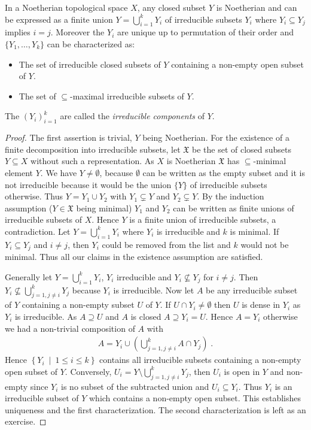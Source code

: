 \documentclass[DIV=14,parskip=full,pointednumbers]{scrartcl}
\theoremstyle{cthm}
\theoremstyle{cvarthm}
\theoremstyle{cdef}
\newcommand{\XX}{\mathfrak{X}}
\newcommand{\st}{\ \middle|\ }
\begin{document}
\begin{prop}[a.k.a. Proposition 2]
 In a Noetherian topological space $X$, any closed subset $Y$ is Noetherian and can be expressed as a finite union $Y= \bigcup_{i=1}^k Y_i$ of irreducible subsets $Y_i$ where $Y_i\subseteq Y_j$ implies $i=j$. Moreover the $Y_i$ are unique up to permutation of their order and $\{Y_1,\ldots, Y_k\}$ can be characterized as:
 \begin{itemize}
  \item The set of irreducible closed subsets of $Y$ containing a non-empty open subset of $Y$.
  \item The set of $\subseteq$-maximal irreducible subsets of $Y$.
 \end{itemize}
The $(Y_i)_{i=1}^k$ are called the \emph{irreducible components} of $Y$.
\end{prop}
\begin{proof}
 The first assertion is trivial, $Y$ being Noetherian. For the existence of a finite decomposition into irreducible subsets, let $\XX$ be the set of closed subsets $Y\subseteq X$ without such a representation. As $X$ is Noetherian $\XX$ has $\subseteq $-minimal element $Y$. We have $Y\neq \emptyset$, because $\emptyset$ can be written as the empty subset and it is not irreducible because it would be the union $\{Y\}$ of irreducible subsets otherwise. Thus $Y= Y_1\cup Y_2$ with $Y_1\subsetneq Y$ and $Y_2\subsetneq Y$. By the induction assumption ($Y\in \XX$ being minimal) $Y_1$ and $Y_2$ can be written as finite unions of irreducible subsets of $X$. Hence $Y$ is a finite union of irreducible subsets, a contradiction. Let $Y=\bigcup_{i=1}^k Y_i$ where $Y_i$ is irreducible and $k$ is minimal. If $Y_i\subseteq Y_j$ and $i\neq j$, then $Y_i$ could be removed from the list and $k$ would not be minimal. Thus all our claims in the existence assumption are satisfied.
 
 Generally let $Y=\bigcup_{i=1}^kY_i$, $Y_i$ irreducible and $Y_i\not\subseteq Y_j$ for $i\neq j$. Then $Y_i\not\subseteq \bigcup_{j=1, j\neq i}^k Y_j$ because $Y_i$ is irreducible. Now let $A$ be any irreducible subset of $Y$ containing a non-empty subset $U$ of $Y$. If $U\cap Y_i\neq \emptyset$ then $U$ is dense in $Y_i$ as $Y_i$ is irreducible. As $A\supseteq U$ and $A$ is closed $A\supseteq Y_i = U$. Hence $A=Y_i$ otherwise we had a non-trivial composition of $A$ with 
 \begin{align*}
  A= Y_i \cup \left(\bigcup_{j=1, j\neq i}^k A\cap Y_j\right)\;.
 \end{align*}
Hence $\left\{ Y_i\st 1\leq i \leq k\right\}$ contains all irreducible subsets containing a non-empty open subset of $Y$. Conversely, $U_i = Y\setminus \bigcup_{j=1, j\neq i}^k Y_j$, then $U_i$ is open in $Y$ and non-empty since $Y_i$ is no subset of the subtracted union and $U_i\subseteq Y_i$. Thus $Y_i$ is an irreducible subset of $Y$ which contains a non-empty open subset. This establishes uniqueness and the first characterization. The second characterization is left as an exercise.
\end{proof}
\end{document}

